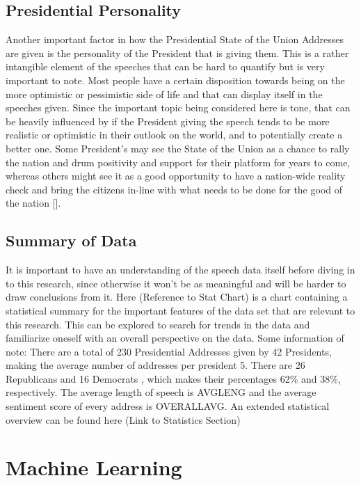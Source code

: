 \subsection{Presidential Personality}
Another important factor in how the Presidential State of the Union Addresses are given is the personality of the President that is giving them.
This is a rather intangible element of the speeches that can be hard to quantify but is very important to note.
Most people have a certain disposition towards being on the more optimistic or pessimistic side of life and that can display itself in the speeches given.
Since the important topic being considered here is tone, that can be heavily influenced by if the President giving the speech tends to be more realistic or optimistic in their outlook on the world, and to potentially create a better one.
Some President's may see the State of the Union as a chance to rally the nation and drum positivity and support for their platform for years to come, whereas others might see it as a good opportunity to have a nation-wide reality check and bring the citizens in-line with what needs to be done for the good of the nation [\cite{teten2003evolution}].

\subsection{Summary of Data}
It is important to have an understanding of the speech data itself before diving in to this research, since otherwise it won't be as meaningful and will be harder to draw conclusions from it. Here (Reference to Stat Chart) is a chart containing a statistical summary for the important features of the data set that are relevant to this research.
This can be explored to search for trends in the data and familiarize oneself with an overall perspective on the data.
Some information of note: 
There are a total of 230 Presidential Addresses given by 42 Presidents, making the average number of addresses per president 5. 
There are 26 Republicans and 16 Democrats , which makes their percentages 62\% and 38\%, respectively.
The average length of speech is AVGLENG and the average sentiment score of every address is OVERALLAVG.
An extended statistical overview can be found here (Link to Statistics Section)

\section{Machine Learning}

